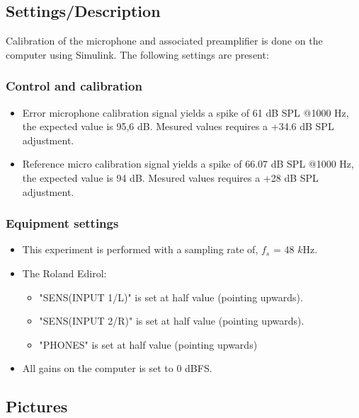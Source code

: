 \subsection{Settings/Description}
\label{SettingsCacellationPath}

Calibration of the microphone and associated preamplifier is done on the computer using Simulink\textsuperscript{\textregistered}. The following settings are present:

\subsubsection{Control and calibration}
\begin{itemize}
	\item Error microphone calibration signal yields a spike of 61 dB SPL @1000 Hz, the expected value is 95,6 dB. Mesured values requires a +34.6 dB SPL adjustment.
	\item Reference micro calibration signal yields a spike of 66.07 dB SPL @1000 Hz, the expected value is 94 dB. Mesured values requires a +28 dB SPL adjustment.
\end{itemize}


\subsubsection{Equipment settings}
\begin{itemize}
	\item This experiment is performed with a sampling rate of, $f_{s}$ = 48 $k$Hz.
	\item The Roland Edirol:
		\begin{itemize}
			\item "SENS(INPUT 1/L)" is set at half value (pointing upwards).
			\item "SENS(INPUT 2/R)" is set at half value (pointing upwards).
			\item "PHONES" is set at half value (pointing upwards)
		\end{itemize}				
	\item All gains on the computer is set to 0 dBFS.
\end{itemize}


\subsection{Pictures}

